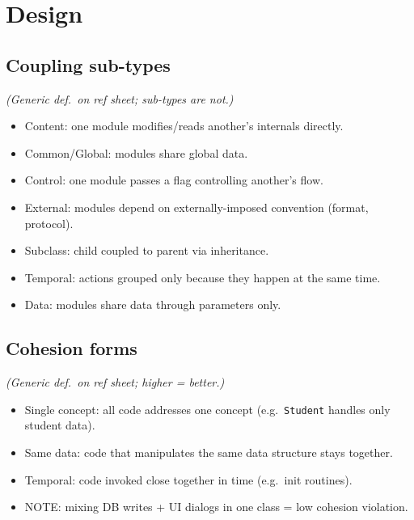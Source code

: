 \section{Design}

\subsection{Coupling sub-types}
\textit{(Generic def.\ on ref sheet; sub-types are not.)}
\begin{itemize}
  \item \textcolor{Bittersweet}{Content}: one module modifies/reads another's internals directly.
  \item \textcolor{Bittersweet}{Common/Global}: modules share global data.
  \item \textcolor{Bittersweet}{Control}: one module passes a flag controlling another's flow.
  \item \textcolor{Bittersweet}{External}: modules depend on externally-imposed convention (format, protocol).
  \item \textcolor{Bittersweet}{Subclass}: child coupled to parent via inheritance.
  \item \textcolor{Bittersweet}{Temporal}: actions grouped only because they happen at the same time.
  \item \textcolor{Bittersweet}{Data}: modules share data through parameters only.
\end{itemize}

\subsection{Cohesion forms}
\textit{(Generic def.\ on ref sheet; higher = better.)}
\begin{itemize}
  \item \textcolor{Bittersweet}{Single concept}: all code addresses one concept (e.g.\ \texttt{Student} handles only student data).
  \item \textcolor{Bittersweet}{Same data}: code that manipulates the same data structure stays together.
  \item \textcolor{Bittersweet}{Temporal}: code invoked close together in time (e.g.\ init routines).
  \item \textcolor{Bittersweet}{NOTE}: mixing DB writes + UI dialogs in one class = low cohesion violation.
\end{itemize}

